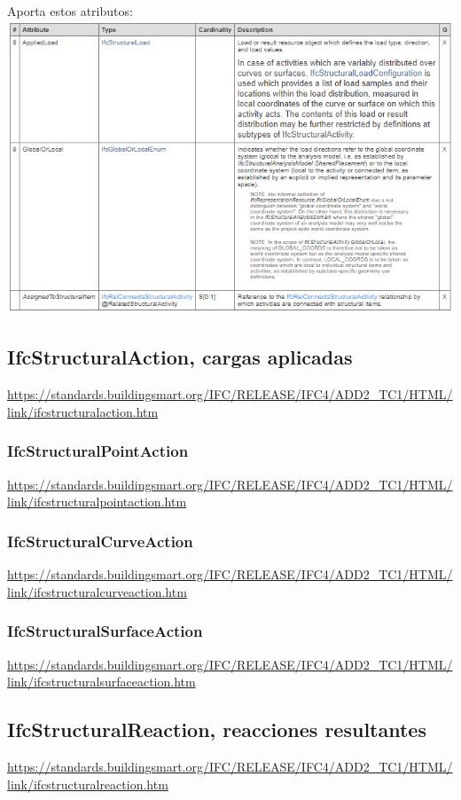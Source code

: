 \documentclass[spanish,12pt,a4paper,final,oneside]{book}
\begin{document}
Aporta estos atributos:
\\ \includegraphics[width=\textwidth]{atributos de IfcStructuralActivity}


\subsection{IfcStructuralAction, cargas aplicadas}
\url{https://standards.buildingsmart.org/IFC/RELEASE/IFC4/ADD2_TC1/HTML/link/ifcstructuralaction.htm}

\subsubsection{IfcStructuralPointAction}
\url{https://standards.buildingsmart.org/IFC/RELEASE/IFC4/ADD2_TC1/HTML/link/ifcstructuralpointaction.htm}

\subsubsection{IfcStructuralCurveAction}
\url{https://standards.buildingsmart.org/IFC/RELEASE/IFC4/ADD2_TC1/HTML/link/ifcstructuralcurveaction.htm}

\subsubsection{IfcStructuralSurfaceAction}
\url{https://standards.buildingsmart.org/IFC/RELEASE/IFC4/ADD2_TC1/HTML/link/ifcstructuralsurfaceaction.htm}


\subsection{IfcStructuralReaction, reacciones resultantes}
\url{https://standards.buildingsmart.org/IFC/RELEASE/IFC4/ADD2_TC1/HTML/link/ifcstructuralreaction.htm}
\end{document}
